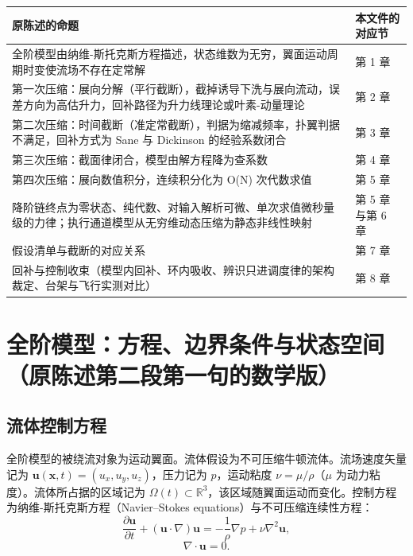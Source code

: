 \documentclass[11pt,a4paper]{ctexart}
\numberwithin{equation}{section}
\newcommand{\R}{\mathbb{R}}
\begin{document}
\begin{table}[htbp]
  \centering
  \small
  \begin{tabularx}{\textwidth}{@{} >{\raggedright\arraybackslash}p{9.2cm} X @{}}
    \toprule
    原陈述的命题 & 本文件的对应节 \\
    \midrule
    全阶模型由纳维-斯托克斯方程描述，状态维数为无穷，翼面运动周期时变使流场不存在定常解 & 第 1 章 \\
    第一次压缩：展向分解（平行截断），截掉诱导下洗与展向流动，误差方向为高估升力，回补路径为升力线理论或叶素-动量理论 & 第 2 章 \\
    第二次压缩：时间截断（准定常截断），判据为缩减频率，扑翼判据不满足，回补方式为 Sane 与 Dickinson 的经验系数闭合 & 第 3 章 \\
    第三次压缩：截面律闭合，模型由解方程降为查系数 & 第 4 章 \\
    第四次压缩：展向数值积分，连续积分化为 O(N) 次代数求值 & 第 5 章 \\
    降阶链终点为零状态、纯代数、对输入解析可微、单次求值微秒量级的力律；执行通道模型从无穷维动态压缩为静态非线性映射 & 第 5 章与第 6 章 \\
    假设清单与截断的对应关系 & 第 7 章 \\
    回补与控制收束（模型内回补、环内吸收、辨识只进调度律的架构裁定、台架与飞行实测对比） & 第 8 章 \\
    \bottomrule
  \end{tabularx}
\end{table}

\section{全阶模型：方程、边界条件与状态空间（原陈述第二段第一句的数学版）}\label{sec:full}

\subsection{流体控制方程}

全阶模型的被绕流对象为运动翼面。流体假设为不可压缩牛顿流体。流场速度矢量记为 $\bm{u}(\bm{x}, t) = (u_x, u_y, u_z)$，压力记为 $p$，运动粘度 $\nu = \mu/\rho$（$\mu$ 为动力粘度）。流体所占据的区域记为 $\Omega(t) \subset \R^3$，该区域随翼面运动而变化。控制方程为纳维-斯托克斯方程（Navier--Stokes equations）与不可压缩连续性方程：
\begin{equation}
  \frac{\partial\bm{u}}{\partial t} + (\bm{u}\cdot\nabla)\bm{u}
  = -\frac{1}{\rho}\nabla p + \nu\nabla^2\bm{u}, \label{eq:1-1}
\end{equation}
\begin{equation}
  \nabla\cdot\bm{u} = 0. \label{eq:1-2}
\end{equation}
\end{document}
